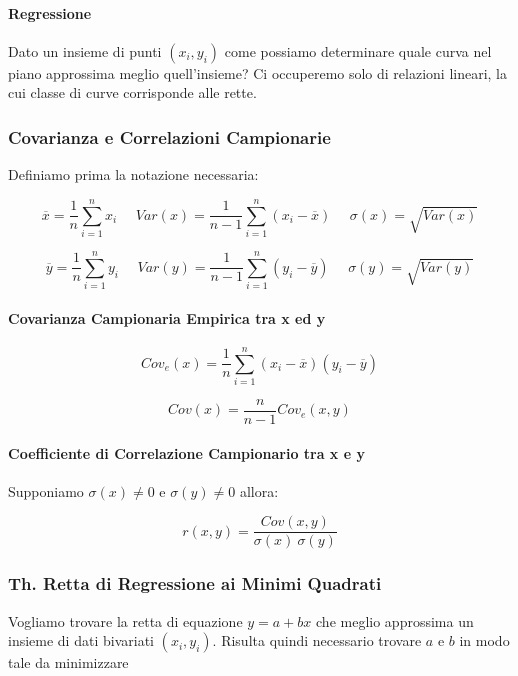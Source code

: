 \documentclass{article}
\begin{document}
\paragraph{Regressione} Dato un insieme di punti $(x_{i}, y_{i})$ come possiamo determinare quale curva nel piano approssima meglio quell'insieme? Ci occuperemo solo di
relazioni lineari, la cui classe di curve corrisponde alle rette.

\subsubsection{Covarianza e Correlazioni Campionarie}

Definiamo prima la notazione necessaria:

\[ \boxed{\overline{x} = \frac{1}{n} \sum^{n}_{i=1} x_{i}} \:\:\:\:\:\: \boxed{Var(x) = \frac{1}{n-1}\sum_{i=1}^{n} (x_{i} - \overline{x})} \:\:\:\:\:\: \boxed{\sigma(x) = \sqrt{Var(x)}} \]

\[ \boxed{\overline{y} = \frac{1}{n} \sum^{n}_{i=1} y_{i}} \:\:\:\:\:\: \boxed{Var(y) = \frac{1}{n-1}\sum_{i=1}^{n} (y_{i} - \overline{y})} \:\:\:\:\:\: \boxed{\sigma(y) = \sqrt{Var(y)}} \]

\newpage

\paragraph{Covarianza Campionaria Empirica tra x ed y}

\[ Cov_{e}(x) = \frac{1}{n} \sum^{n}_{i=1} (x_{i} - \overline{x}) (y_{i} - \overline{y}) \]

\[ Cov(x) = \frac{n}{n-1}Cov_{e}(x,y) \]

\paragraph{Coefficiente di Correlazione Campionario tra x e y} Supponiamo $\sigma(x) \neq 0$ e $\sigma(y) \neq 0$ allora:

\vspace*{8px}

\[ r(x,y) = \frac{Cov(x,y)}{\sigma(x) \: \sigma(y)} \]

\subsubsection{Th. Retta di Regressione ai Minimi Quadrati}

Vogliamo trovare la retta di equazione $y=a+bx$ che meglio approssima un insieme di dati bivariati $(x_{i}, y_{i})$. Risulta quindi necessario trovare $a$ e $b$ in modo tale da minimizzare
\end{document}
